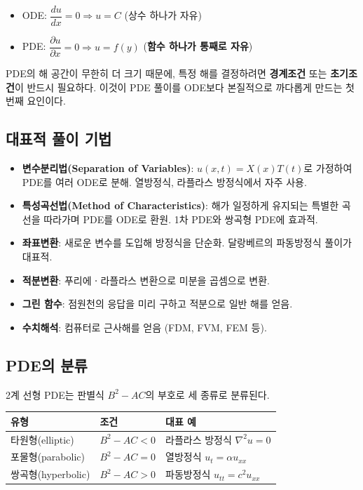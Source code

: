 \documentclass[11pt,a4paper]{article}
\begin{document}
\begin{itemize}
\item ODE: $\dfrac{du}{dx} = 0 \Rightarrow u = C$ \quad (상수 하나가 자유)
\item PDE: $\dfrac{\partial u}{\partial x} = 0 \Rightarrow u = f(y)$ \quad (\textbf{함수 하나가 통째로 자유})
\end{itemize}

PDE의 해 공간이 무한히 더 크기 때문에, 특정 해를 결정하려면 \textbf{경계조건} 또는 \textbf{초기조건}이 반드시 필요하다. 이것이 PDE 풀이를 ODE보다 본질적으로 까다롭게 만드는 첫 번째 요인이다.

\subsection{대표적 풀이 기법}

\begin{itemize}
\item \textbf{변수분리법(Separation of Variables)}: $u(x,t) = X(x)T(t)$로 가정하여 PDE를 여러 ODE로 분해. 열방정식, 라플라스 방정식에서 자주 사용.
\item \textbf{특성곡선법(Method of Characteristics)}: 해가 일정하게 유지되는 특별한 곡선을 따라가며 PDE를 ODE로 환원. 1차 PDE와 쌍곡형 PDE에 효과적.
\item \textbf{좌표변환}: 새로운 변수를 도입해 방정식을 단순화. 달랑베르의 파동방정식 풀이가 대표적.
\item \textbf{적분변환}: 푸리에ㆍ라플라스 변환으로 미분을 곱셈으로 변환.
\item \textbf{그린 함수}: 점원천의 응답을 미리 구하고 적분으로 일반 해를 얻음.
\item \textbf{수치해석}: 컴퓨터로 근사해를 얻음 (FDM, FVM, FEM 등).
\end{itemize}

\subsection{PDE의 분류}

2계 선형 PDE는 판별식 $B^2 - AC$의 부호로 세 종류로 분류된다.

\begin{center}
\begin{tabular}{lll}
\toprule
유형 & 조건 & 대표 예 \\
\midrule
타원형(elliptic) & $B^2 - AC < 0$ & 라플라스 방정식 $\nabla^2 u = 0$ \\
포물형(parabolic) & $B^2 - AC = 0$ & 열방정식 $u_t = \alpha u_{xx}$ \\
쌍곡형(hyperbolic) & $B^2 - AC > 0$ & 파동방정식 $u_{tt} = c^2 u_{xx}$ \\
\bottomrule
\end{tabular}
\end{center}
\end{document}
